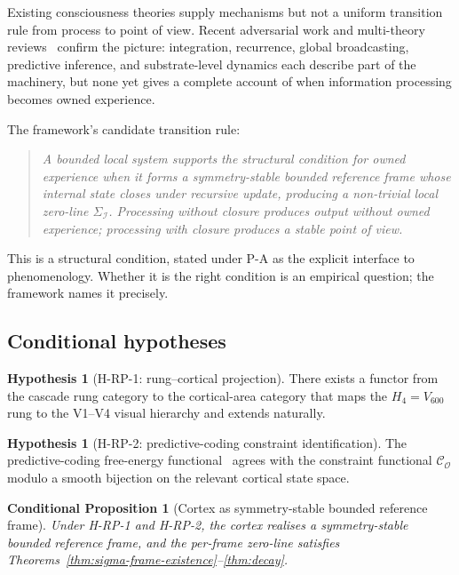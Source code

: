 \documentclass[11pt]{article}
\theoremstyle{plain}
\newtheorem{conditional}[theorem]{Conditional Proposition}
\theoremstyle{definition}
\newtheorem{hypothesis}[theorem]{Hypothesis}
\theoremstyle{remark}
\newcommand{\Ical}{\mathcal{I}}
\newcommand{\Ocal}{\mathcal{O}}
\newcommand{\Ccal}{\mathcal{C}}
\begin{document}
Existing consciousness theories supply mechanisms but not a uniform transition rule from process to point of view. Recent adversarial work and multi-theory reviews~\citep{ConsciousnessAdversarial, ConsciousnessFiveTheories, ConsciousnessUnderSpotlight} confirm the picture: integration, recurrence, global broadcasting, predictive inference, and substrate-level dynamics each describe part of the machinery, but none yet gives a complete account of when information processing becomes owned experience.

The framework's candidate transition rule:

\begin{quote}
\textit{A bounded local system supports the structural condition for owned experience when it forms a symmetry-stable bounded reference frame whose internal state closes under recursive update, producing a non-trivial local zero-line $\Sigma_\Ical$. Processing without closure produces output without owned experience; processing with closure produces a stable point of view.}
\end{quote}

This is a structural condition, stated under P-A as the explicit interface to phenomenology. Whether it is the right condition is an empirical question; the framework names it precisely.

\subsection{Conditional hypotheses}

\begin{hypothesis}[H-RP-1: rung--cortical projection]\label{hyp:rp-1}
There exists a functor from the cascade rung category to the cortical-area category that maps the $H_4 = V_{600}$ rung to the V1--V4 visual hierarchy and extends naturally.
\end{hypothesis}

\begin{hypothesis}[H-RP-2: predictive-coding constraint identification]\label{hyp:rp-2}
The predictive-coding free-energy functional~\citep{FristonFreeEnergy} agrees with the constraint functional $\Ccal_\Ocal$ modulo a smooth bijection on the relevant cortical state space.
\end{hypothesis}

\begin{conditional}[Cortex as symmetry-stable bounded reference frame]\label{cthm:cortex-frame}
Under H-RP-1 and H-RP-2, the cortex realises a symmetry-stable bounded reference frame, and the per-frame zero-line satisfies Theorems~\ref{thm:sigma-frame-existence}--\ref{thm:decay}.
\end{conditional}
\end{document}

